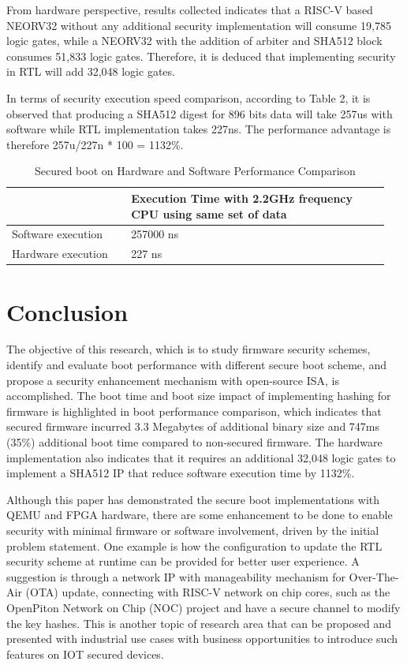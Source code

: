 \documentclass[review]{elsarticle}
\begin{document}
From hardware perspective, results collected indicates that a RISC-V based NEORV32 without any additional security implementation will consume 19,785 logic gates, while a NEORV32 with the addition of arbiter and SHA512 block consumes 51,833 logic gates. Therefore, it is deduced that implementing security in RTL will add 32,048 logic gates.

In terms of security execution speed comparison, according to Table 2, it is observed that producing a SHA512 digest for 896 bits data will take 257us with software while RTL implementation takes 227ns. The performance advantage is therefore 257u/227n * 100 = 1132\%.

\begin{table}[hbt!]
\caption{Secured boot on Hardware and Software Performance Comparison}
    \begin{tabular}{|p{0.3\linewidth} | p{0.65\linewidth} |}
        \hline
         & Execution Time with 2.2GHz frequency CPU using same set of data \\
        \hline 
        Software execution & 257000 ns  \\
        \hline
        Hardware execution & 227 ns \\
        \hline
    \end{tabular}
\end{table}

\section{ Conclusion}
The objective of this research, which is to study firmware security schemes, identify and evaluate boot performance with different secure boot scheme, and propose a security enhancement mechanism with open-source ISA, is accomplished. The boot time and boot size impact of implementing hashing for firmware is highlighted in boot performance comparison, which indicates that secured firmware incurred 3.3 Megabytes of additional binary size and 747ms (35\%) additional boot time compared to non-secured firmware. The hardware implementation also indicates that it requires an additional 32,048 logic gates to implement a SHA512 IP that reduce software execution time by 1132\%.

Although this paper has demonstrated the secure boot implementations with QEMU and FPGA hardware, there are some enhancement to be done to enable security with minimal firmware or software involvement, driven by the initial problem statement. One example is how the configuration to update the RTL security scheme at runtime can be provided for better user experience. A suggestion is through a network IP with manageability mechanism for Over-The-Air (OTA) update, connecting with RISC-V network on chip cores, such as the OpenPiton Network on Chip (NOC) project and have a secure channel to modify the key hashes. This is another topic of research area that can be proposed and presented with industrial use cases with business opportunities to introduce such features on IOT secured devices.
\end{document}
